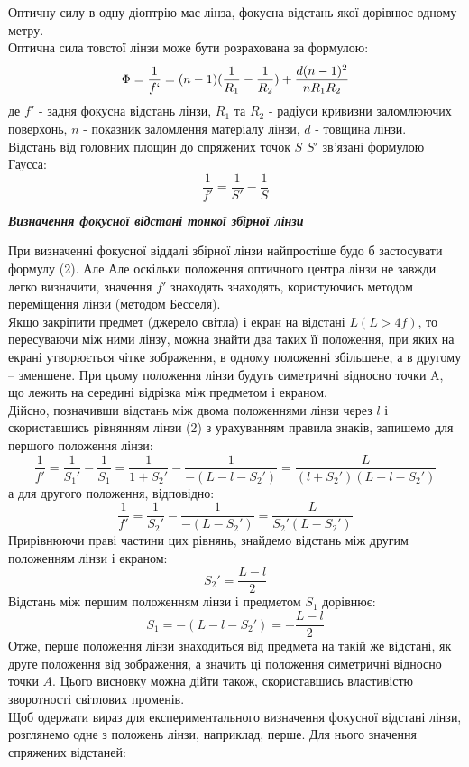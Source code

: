 Оптичну силу в одну діоптрію має лінза, фокусна відстань якої дорівнює одному метру.\\
Оптична сила товстої лінзи може бути розрахована за формулою:
$$\Phi = \frac{1}{f`}=(n-1)(\frac{1}{R_1}-\frac{1}{R_2}) + \frac{d (n-1)^2}{n R_1 R_2}$$
де $f'$ - задня фокусна відстань лінзи, $R_1$ та $R_2$ - радіуси кривизни заломлюючих поверхонь, $n$ - показник заломлення матеріалу лінзи, $d$ - товщина лінзи. \\
Відстань від головних площин до спряжених точок $S$ $S'$ зв'язані формулою Гаусса:
$$\frac{1}{f'} = \frac{1}{S'} - \frac{1}{S}$$
\newpage
\begin{center}
  {\textbf{\emph{Визначення фокусної відстані тонкої збірної лінзи}}}
\end{center}
\indent При визначенні фокусної віддалі збірної лінзи найпростіше будо б застосувати формулу (2). Але Але оскільки положення оптичного центра лінзи не завжди легко визначити, значення $f'$ знаходять знаходять, користуючись методом переміщення лінзи (методом
Бесселя). \\
Якщо закріпити предмет (джерело світла) і екран на відстані $L(L>4f)$, то пересуваючи між ними лінзу, можна знайти два таких її положення, при яких на екрані
утворюється чітке зображення, в одному положенні збільшене,  а в другому – зменшене. При цьому положення лінзи будуть симетричні відносно точки A, що лежить на
середині відрізка між предметом і екраном.\\
Дійсно, позначивши відстань між двома положеннями лінзи через $l$ і скориставшись
рівнянням лінзи (2) з урахуванням правила знаків, запишемо для першого положення лінзи:
$$\frac{1}{f'}= \frac{1}{S_1 '} - \frac{1}{S_1} = \frac{1}{1 + S_2 '} - \frac{1}{-(L-l-S_2 ')} = \frac{L}{(l + S_2 ')(L-l-S_2 ')}$$
а для другого положення, відповідно:
$$\frac{1}{f'}=\frac{1}{S_2'}-\frac{1}{-(L-S_2')}=\frac{L}{S_2'(L-S_2')}$$
Прирівнюючи праві частини цих рівнянь, знайдемо відстань між другим положенням лінзи і
екраном:
$$S_2'=\frac{L-l}{2}$$
Відстань між першим положенням лінзи і предметом $S_1$ дорівнює:
$$S_1=-(L-l-S_2')=-\frac{L-l}{2}$$
Отже, перше положення лінзи знаходиться від предмета на такій же відстані, як друге
положення від зображення, а значить ці положення симетричні відносно точки $A$. Цього
висновку можна дійти також, скориставшись властивістю зворотності світлових променів.\\
Щоб одержати вираз для експериментального визначення фокусної відстані лінзи,
розглянемо одне з положень лінзи, наприклад, перше. Для нього значення спряжених відстаней:
